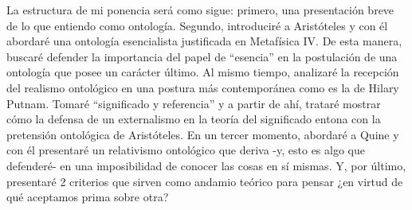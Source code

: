 \documentclass[]{book}
\begin{document}
\begin{refsection}
La estructura de mi ponencia será como sigue: primero, una presentación
breve de lo que entiendo como ontología. Segundo, introduciré a
Aristóteles y con él abordaré una ontología esencialista justificada en
Metafísica IV. De esta manera, buscaré defender la importancia del papel
de ``esencia'' en la postulación de una ontología que posee un carácter
último. Al mismo tiempo, analizaré la recepción del realismo ontológico
en una postura más contemporánea como es la de Hilary Putnam. Tomaré
``significado y referencia'' y a partir de ahí, trataré mostrar cómo la
defensa de un externalismo en la teoría del significado entona con la
pretensión ontológica de Aristóteles. En un tercer momento, abordaré a
Quine y con él presentaré un relativismo ontológico que deriva -y, esto
es algo que defenderé- en una imposibilidad de conocer las cosas en sí
mismas. Y, por último, presentaré 2 criterios que sirven como andamio
teórico para pensar ¿en virtud de qué aceptamos prima sobre otra?


\end{refsection}
\end{document}

